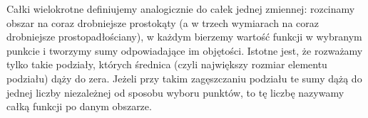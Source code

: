 Całki wielokrotne definiujemy analogicznie do całek jednej zmiennej: rozcinamy obszar na coraz drobniejsze prostokąty (a w trzech wymiarach na coraz drobniejsze prostopadłościany), w każdym bierzemy wartość funkcji w wybranym punkcie i tworzymy sumy odpowiadające im objętości. Istotne jest, że rozważamy tylko takie podziały, których średnica (czyli największy rozmiar elementu podziału) dąży do zera. Jeżeli przy takim zagęszczaniu podziału te sumy dążą do jednej liczby niezależnej od sposobu wyboru punktów, to tę liczbę nazywamy całką funkcji po danym obszarze.

\begin{figure}[H]
    \centering
\end{figure}
